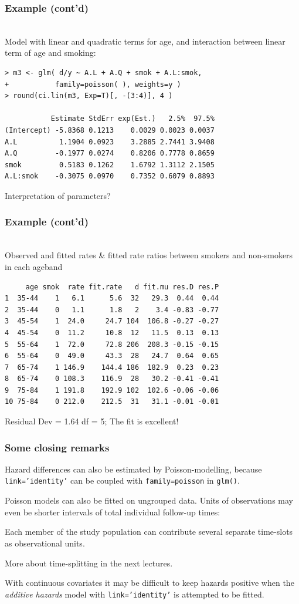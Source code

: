 \documentclass[handout, 12pt]{beamer}
\begin{document}
\begin{frame}[fragile] \frametitle{Example (cont'd)}
\ \\ 
Model with linear and quadratic terms for age, and
interaction between linear term of age and smoking:
\small
\begin{verbatim}
> m3 <- glm( d/y ~ A.L + A.Q + smok + A.L:smok,
+           family=poisson( ), weights=y )
> round(ci.lin(m3, Exp=T)[, -(3:4)], 4 )

           Estimate StdErr exp(Est.)   2.5%  97.5%
(Intercept) -5.8368 0.1213    0.0029 0.0023 0.0037
A.L          1.1904 0.0923    3.2885 2.7441 3.9408
A.Q         -0.1977 0.0274    0.8206 0.7778 0.8659
smok         0.5183 0.1262    1.6792 1.3112 2.1505
A.L:smok    -0.3075 0.0970    0.7352 0.6079 0.8893
\end{verbatim}
\normalsize
Interpretation of parameters?

\end{frame} 

\begin{frame}[fragile] \frametitle{Example (cont'd)}
\ \\
Observed and fitted rates \& fitted 
rate ratios between smokers and non-smokers
in each ageband
{\small
\begin{verbatim}
     age smok  rate fit.rate   d fit.mu res.D res.P
1  35-44    1   6.1      5.6  32   29.3  0.44  0.44
2  35-44    0   1.1      1.8   2    3.4 -0.83 -0.77
3  45-54    1  24.0     24.7 104  106.8 -0.27 -0.27
4  45-54    0  11.2     10.8  12   11.5  0.13  0.13
5  55-64    1  72.0     72.8 206  208.3 -0.15 -0.15
6  55-64    0  49.0     43.3  28   24.7  0.64  0.65
7  65-74    1 146.9    144.4 186  182.9  0.23  0.23
8  65-74    0 108.3    116.9  28   30.2 -0.41 -0.41
9  75-84    1 191.8    192.9 102  102.6 -0.06 -0.06
10 75-84    0 212.0    212.5  31   31.1 -0.01 -0.01
\end{verbatim}
\normalsize
Residual Dev = 1.64  df = 5; The fit is excellent! 
}
\end{frame} 

\begin{frame}

\frametitle{Some closing remarks}
\bi
\item
  Hazard differences can also be estimated by
Poisson-modelling, because {\tt link='identity'}
can be coupled with {\tt family=poisson}  in {\tt glm()}.
\medskip
\item
  Poisson models can also be fitted on ungrouped data.
Units of observations may even be shorter intervals of
total individual follow-up times: 
\bi
\item
Each member of the
study population can contribute several separate
time-slots as observational units. 
\item
More about time-splitting in the next lectures.
\ei
\item
  With continuous covariates it may be difficult to keep
hazards positive when the \textit{additive hazards}
model with \texttt{link='identity'} is attempted to be fitted.
\ei
\end{frame}
\end{document}
